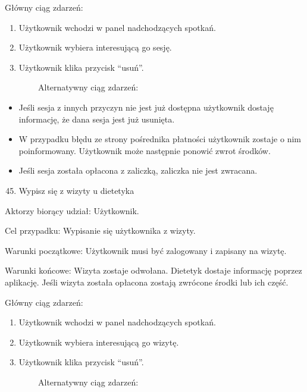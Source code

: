 \documentclass[
]{article}
\providecommand{\tightlist}{%
  \setlength{\itemsep}{0pt}\setlength{\parskip}{0pt}}
\begin{document}
{Główny ciąg zdarzeń: }

\begin{enumerate}
\tightlist
\item
  {Użytkownik wchodzi w panel nadchodzących spotkań.}
\item
  {Użytkownik wybiera interesującą go sesję.}
\item
  {Użytkownik klika przycisk ``usuń''.}
\end{enumerate}

{~~~~~~~~Alternatywny ciąg zdarzeń:}

\begin{itemize}
\tightlist
\item
  {Jeśli sesja z innych przyczyn nie jest już dostępna użytkownik
  dostaję informację, że dana sesja jest już usunięta.}
\item
  {W przypadku błędu ze strony pośrednika płatności użytkownik zostaje o
  nim poinformowany. Użytkownik może następnie ponowić zwrot środków.}
\item
  {Jeśli sesja została opłacona z zaliczką, zaliczka nie jest zwracana.}
\end{itemize}

{}

\begin{enumerate}
\setcounter{enumi}{44}
\tightlist
\item
  {Wypisz się z wizyty u dietetyka}
\end{enumerate}

{Aktorzy biorący udział: Użytkownik.}

{Cel przypadku: Wypisanie się użytkownika z wizyty.}

{Warunki początkowe: Użytkownik musi być zalogowany i zapisany na
wizytę. }

{Warunki końcowe: Wizyta zostaje odwołana. Dietetyk dostaje informację
poprzez aplikację. Jeśli wizyta została opłacona zostają zwrócone środki
lub ich część.}

{Główny ciąg zdarzeń: }

\begin{enumerate}
\tightlist
\item
  {Użytkownik wchodzi w panel nadchodzących spotkań.}
\item
  {Użytkownik wybiera interesującą go wizytę.}
\item
  {Użytkownik klika przycisk ``usuń''.}
\end{enumerate}

{~~~~~~~~Alternatywny ciąg zdarzeń:}
\end{document}
